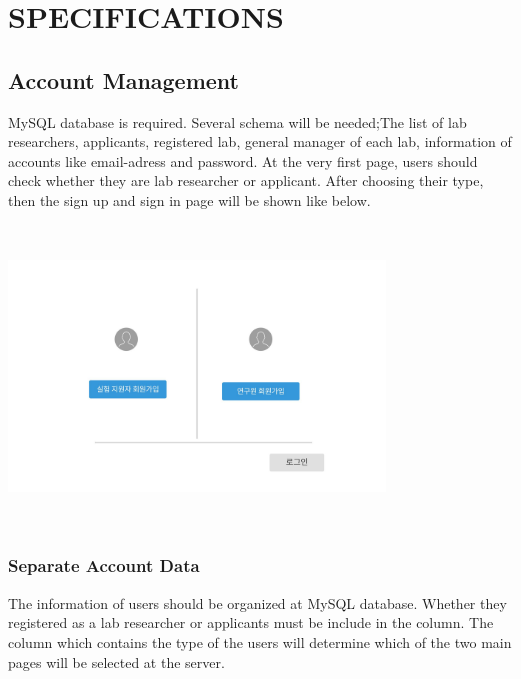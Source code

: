 \documentclass[letterpaper, 10 pt, conference]{ieeeconf}  %
\begin{document}
\section{SPECIFICATIONS}

\subsection{Account Management}


MySQL database is required. Several schema will be needed;The list of lab researchers, applicants, registered lab, general manager of each lab, information of accounts like email-adress and password. At the very first page, users should check whether they are lab researcher or applicant. After choosing their type, then the sign up and sign in page will be shown like below.\\
\includegraphics[width=10cm,height=8cm]{Oven/01_firstpage}




\subsubsection{Separate Account Data}
The information of users should be organized at MySQL database. Whether they registered as a lab researcher or applicants must be include in the column. The column which contains the type of the users will determine which of the two main pages will be selected at the server. 
\end{document}
